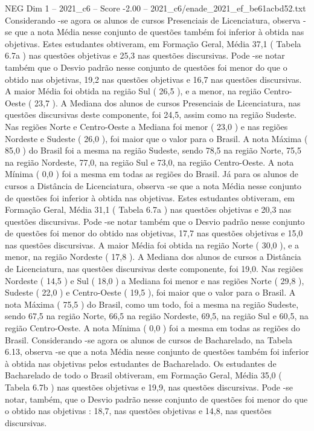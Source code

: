 \begin{textsample}{NEG Dim 1 – 2021\_c6 – Score -2.00 – 2021\_c6/enade\_2021\_ef\_be61acbd52.txt}
Considerando -se agora os alunos de cursos Presenciais de Licenciatura, observa -se que a nota Média nesse conjunto de questões também foi inferior à obtida nas objetivas.
Estes estudantes obtiveram, em Formação Geral, Média 37,1 ( Tabela 6.7a ) nas questões objetivas e 25,3 nas questões discursivas.
Pode -se notar também que o Desvio padrão nesse conjunto de questões foi menor do que o obtido nas objetivas, 19,2 nas questões objetivas e 16,7 nas questões discursivas.
A maior Média foi obtida na região Sul ( 26,5 ), e a menor, na região Centro-Oeste ( 23,7 ).
A Mediana dos alunos de cursos Presenciais de Licenciatura, nas questões discursivas deste componente, foi 24,5, assim como na região Sudeste.
Nas regiões Norte e Centro-Oeste a Mediana foi menor ( 23,0 ) e nas regiões Nordeste e Sudeste ( 26,0 ), foi maior que o valor para o Brasil.
A nota Máxima ( 85,0 ) do Brasil foi a mesma na região Sudeste, sendo 78,5 na região Norte, 75,5 na região Nordeste, 77,0, na região Sul e 73,0, na região Centro-Oeste.
A nota Mínima ( 0,0 ) foi a mesma em todas as regiões do Brasil.
Já para os alunos de cursos a Distância de Licenciatura, observa -se que a nota Média nesse conjunto de questões foi inferior à obtida nas objetivas.
Estes estudantes obtiveram, em Formação Geral, Média 31,1 ( Tabela 6.7a ) nas questões objetivas e 20,3 nas questões discursivas.
Pode -se notar também que o Desvio padrão nesse conjunto de questões foi menor do obtido nas objetivas, 17,7 nas questões objetivas e 15,0 nas questões discursivas.
A maior Média foi obtida na região Norte ( 30,0 ), e a menor, na região Nordeste ( 17,8 ).
A Mediana dos alunos de cursos a Distância de Licenciatura, nas questões discursivas deste componente, foi 19,0.
Nas regiões Nordeste ( 14,5 ) e Sul ( 18,0 ) a Mediana foi menor e nas regiões Norte ( 29,8 ), Sudeste ( 22,0 ) e Centro-Oeste ( 19,5 ), foi maior que o valor para o Brasil.
A nota Máxima ( 75,5 ) do Brasil, como um todo, foi a mesma na região Sudeste, sendo 67,5 na região Norte, 66,5 na região Nordeste, 69,5, na região Sul e 60,5, na região Centro-Oeste.
A nota Mínima ( 0,0 ) foi a mesma em todas as regiões do Brasil.
Considerando -se agora os alunos de cursos de Bacharelado, na Tabela 6.13, observa -se que a nota Média nesse conjunto de questões também foi inferior à obtida nas objetivas pelos estudantes de Bacharelado.
Os estudantes de Bacharelado de todo o Brasil obtiveram, em Formação Geral, Média 35,0 ( Tabela 6.7b ) nas questões objetivas e 19,9, nas questões discursivas.
Pode -se notar, também, que o Desvio padrão nesse conjunto de questões foi menor do que o obtido nas objetivas : 18,7, nas questões objetivas e 14,8, nas questões discursivas.

\end{textsample}
